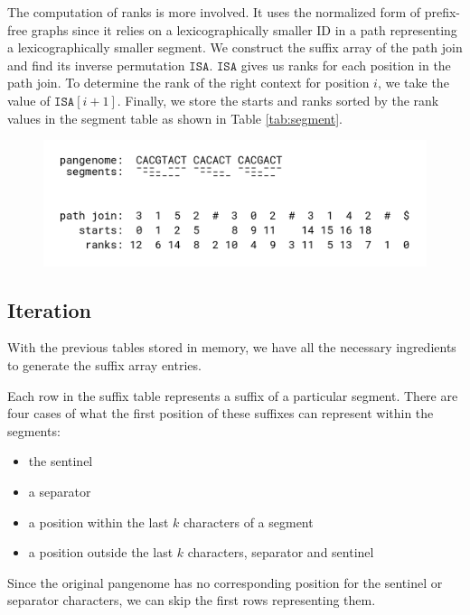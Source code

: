 The computation of ranks is more involved.
It uses the normalized form of prefix-free graphs since it relies on a lexicographically smaller ID in a path representing a lexicographically smaller segment.
We construct the suffix array of the path join and find its inverse permutation $\texttt{ISA}$.
$\texttt{ISA}$ gives us ranks for each position in the path join.
To determine the rank of the right context for position $i$, we take
the value of $\texttt{ISA}[i+1]$.
Finally, we store the starts and ranks sorted by the rank values in the segment table as shown in Table \ref{tab:segment}.

\begin{figure}
    \centering
    \includegraphics[width=\linewidth]{images/path_join.png}
    \caption{}
    \label{fig:path_join}
\end{figure}



\subsection{Iteration}
With the previous tables stored in memory, we have all the necessary ingredients to generate the suffix array entries.

Each row in the suffix table represents a suffix of a particular segment.
There are four cases of what the first position of these suffixes can represent within the segments:
\begin{itemize}
    \item the sentinel
    \item a separator
    \item a position within the last $k$ characters of a segment
    \item a position outside the last $k$ characters, separator and sentinel
\end{itemize}

Since the original pangenome has no corresponding position for the sentinel or separator characters, we can skip the first rows representing them.

